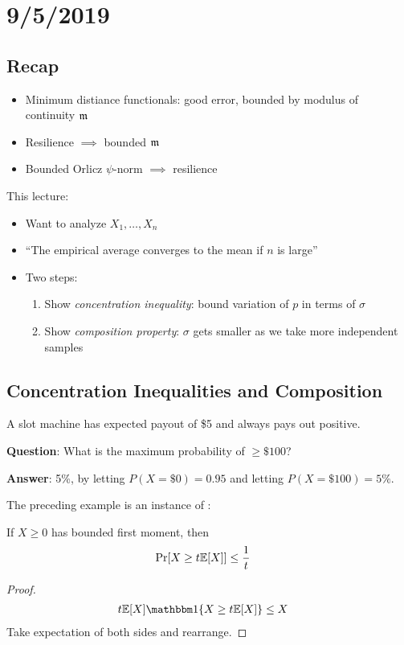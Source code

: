 \section{9/5/2019}

\subsection{Recap}

\begin{itemize}
    \item Minimum distiance functionals: good error, bounded by modulus of continuity $\mathfrak{m}$
    \item Resilience $\implies$ bounded $\mathfrak{m}$
    \item Bounded Orlicz $\psi$-norm $\implies$ resilience
\end{itemize}
This lecture:
\begin{itemize}
    \item Want to analyze $X_1, \ldots, X_n$
    \item ``The empirical average converges to the mean if $n$ is large''
    \item Two steps:
    \begin{enumerate}
        \item Show \emph{concentration inequality}: bound variation of $p$ in terms of $\sigma$
        \item Show \emph{composition property}: $\sigma$ gets smaller as we take more independent samples
    \end{enumerate}
\end{itemize}

\subsection{Concentration Inequalities and Composition}

\begin{example}
    A slot machine has expected payout of \$5 and always pays out positive.

    \textbf{Question}: What is the maximum probability of $\geq \$100$?

    \textbf{Answer}: 5\%, by letting $P(X=\$0) = 0.95$ and letting $P(X=\$100) = 5\%$.
\end{example}

The preceding example is an instance of :
\begin{theorem}\label{thm:markov}
    If $X \geq 0$ has bounded first moment, then
    \begin{align}
        \Pr[X \geq t \mathbb{E}[X]] &\leq \frac{1}{t}
    \end{align}
\end{theorem}
\begin{proof}
    \begin{align}
        t \ex[X] \ind\{X \geq t \ex[X]\} &\leq X
    \end{align}
    Take expectation of both sides and rearrange.
\end{proof}

